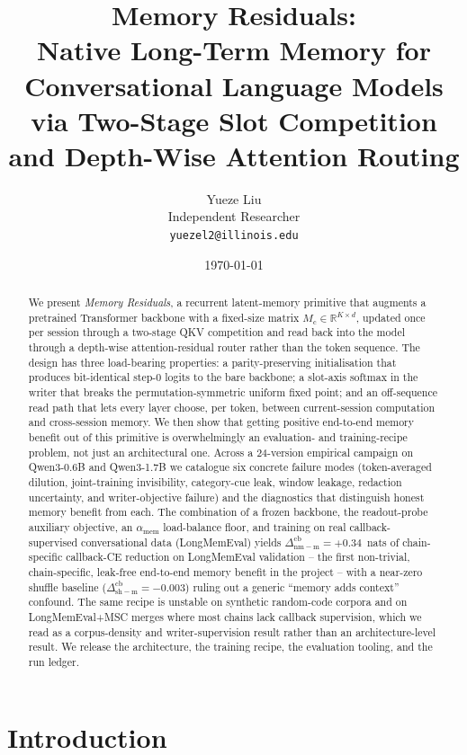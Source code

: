 \documentclass[11pt]{article}
\title{\textbf{Memory Residuals:}\\[2pt]
       Native Long-Term Memory for Conversational Language Models\\[2pt]
       via Two-Stage Slot Competition and Depth-Wise Attention Routing}
\author{%
  Yueze Liu \\
  Independent Researcher \\
  \texttt{yuezel2@illinois.edu}
}
\date{\today}
\newcommand{\Mc}{M_{\mathrm{c}}}
\newcommand{\dnm}{\Delta_{\mathrm{nm{-}m}}}
\newcommand{\dsh}{\Delta_{\mathrm{sh{-}m}}}
\newcommand{\amem}{\alpha_{\mathrm{mem}}}
\begin{document}
\maketitle

\begin{abstract}
We present \emph{Memory Residuals}, a recurrent latent-memory primitive
that augments a pretrained Transformer backbone with a fixed-size matrix
$\Mc \in \mathbb{R}^{K \times d}$, updated once per session through a
two-stage QKV competition and read back into the model through a
depth-wise attention-residual router rather than the token sequence.
The design has three load-bearing properties: a parity-preserving
initialisation that produces bit-identical step-0 logits to the bare
backbone; a slot-axis softmax in the writer that breaks the
permutation-symmetric uniform fixed point; and an off-sequence
read path that lets every layer choose, per token, between current-session
computation and cross-session memory.
We then show that getting positive end-to-end memory benefit out of this
primitive is overwhelmingly an evaluation- and training-recipe problem,
not just an architectural one. Across a 24-version empirical campaign on
Qwen3-0.6B and Qwen3-1.7B we catalogue six concrete failure modes
(token-averaged dilution, joint-training invisibility, category-cue
leak, window leakage, redaction uncertainty, and writer-objective
failure) and the diagnostics that distinguish honest memory benefit
from each. The combination of a frozen backbone, the readout-probe
auxiliary objective, an $\amem$ load-balance floor, and training on
real callback-supervised conversational data (LongMemEval) yields
$\dnm^{\mathrm{cb}}=+0.34$~nats of chain-specific callback-CE
reduction on LongMemEval validation -- the first non-trivial,
chain-specific, leak-free end-to-end memory benefit in the project --
with a near-zero shuffle baseline ($\dsh^{\mathrm{cb}}=-0.003$) ruling
out a generic ``memory adds context'' confound. The same recipe is
unstable on synthetic random-code corpora and on
LongMemEval+MSC merges where most chains lack callback supervision,
which we read as a corpus-density and writer-supervision result rather
than an architecture-level result. We release the architecture, the
training recipe, the evaluation tooling, and the run ledger.
\end{abstract}

\section{Introduction}
\label{sec:intro}
\end{document}
